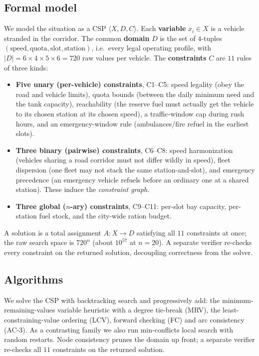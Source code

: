 \documentclass[10pt]{article}
\begin{document}
\subsection{Formal model}
We model the situation as a CSP $\langle X, D, C\rangle$. Each \textbf{variable}
$x_i \in X$ is a vehicle stranded in the corridor. The common \textbf{domain} $D$
is the set of $4$-tuples $(\text{speed},\text{quota},\text{slot},\text{station})$,
i.e.\ every legal operating profile, with
$|D| = 6\times4\times5\times6 = 720$ raw values per vehicle. The
\textbf{constraints} $C$ are $11$ rules of three kinds:
\begin{itemize}[leftmargin=1.4em,itemsep=0pt]
\item \textbf{Five unary (per-vehicle) constraints}, C1--C5: speed legality (obey
the road and vehicle limits), quota bounds (between the daily minimum need and the
tank capacity), reachability (the reserve fuel must actually get the vehicle to
its chosen station at its chosen speed), a traffic-window cap during rush hours,
and an emergency-window rule (ambulances/fire refuel in the earliest slots).
\item \textbf{Three binary (pairwise) constraints}, C6--C8: speed harmonization
(vehicles sharing a road corridor must not differ wildly in speed), fleet
dispersion (one fleet may not stack the same station-and-slot), and emergency
precedence (an emergency vehicle refuels before an ordinary one at a shared
station). These induce the \emph{constraint graph}.
\item \textbf{Three global ($n$-ary) constraints}, C9--C11: per-slot bay capacity,
per-station fuel stock, and the city-wide ration budget.
\end{itemize}
A solution is a total assignment $A:X\to D$ satisfying all $11$ constraints at
once; the raw search space is $720^{n}$ (about $10^{57}$ at $n{=}20$). A separate
verifier re-checks every constraint on the returned solution, decoupling
correctness from the solver.

\subsection{Algorithms}
We solve the CSP with backtracking search and progressively add: the
minimum-remaining-values variable heuristic with a degree tie-break (MRV), the
least-constraining-value ordering (LCV), forward checking (FC) and arc
consistency (AC-3). As a contrasting family we also run min-conflicts local
search with random restarts. Node consistency prunes the domain up front; a
separate verifier re-checks all $11$ constraints on the returned solution.
\end{document}
